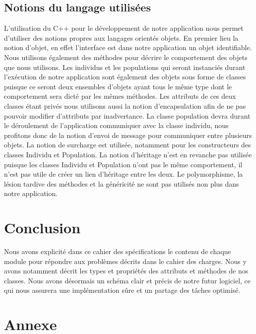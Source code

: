 \documentclass[a4paper,11pt]{article}
\begin{document}
		\subsection{Notions du langage utilisées}
			L’utilisation du C++ pour le développement de notre application nous permet d’utiliser des notions propres aux langages orientés objets.
			En premier lieu la notion d’objet, en effet l’interface est dans notre application un objet identifiable.
			Nous utilisons également des méthodes pour décrire le comportement des objets que nous utilisons.
			Les individus et les populations qui seront instanciés durant l'exécution de notre application sont également des objets sous forme de classes puisque ce seront deux ensembles d’objets ayant tous le même type dont le comportement sera dicté par les mêmes méthodes.
			Les attributs de ces deux classes étant privés nous utilisons aussi la notion d’encapsulation afin de ne pas pouvoir modifier d’attributs par inadvertance.
			La classe population devra durant le déroulement de l’application communiquer avec la classe individu, nous profitons donc de la notion d’envoi de message pour communiquer entre plusieurs objets.
			La notion de surcharge est utilisée, notamment pour les constructeurs des classes Individu et Population.
			La notion d’héritage n’est en revanche pas utilisée puisque les classes Individu et Population n’ont pas le même comportement, il n’est pas utile de créer un lien d’héritage entre les deux.
			Le polymorphisme, la lésion tardive des méthodes et la généricité ne sont pas utilisés non plus dans notre application.\\


	\section{Conclusion}	
		Nous avons explicité dans ce cahier des spécifications le contenu de chaque module pour répondre aux problèmes décrits dans le cahier des charges.
		Nous y avons notamment décrit les types et propriétés des attributs et méthodes de nos classes.
		Nous avons désormais un schéma clair et précis de notre futur logiciel, ce qui nous assurera une implémentation sûre et un partage des tâches optimisé.
		
	\newpage
	\section{Annexe}
\end{document}
